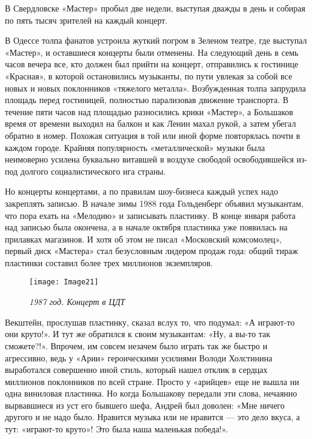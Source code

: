 \documentclass[16pt,a5paper,oneside]{book}
\begin{document}
В Свердловске «Мастер» пробыл две недели, выступая дважды в день и собирая по пять тысяч зрителей на каждый концерт.

В Одессе толпа фанатов устроила жуткий погром в Зеленом театре, где выступал «Мастер», и оставшиеся концерты были
отменены. На следующий день в семь часов вечера все, кто должен был прийти на концерт, отправились к гостинице
«Красная», в которой остановились музыканты, по пути увлекая за собой все новых и новых поклонников «тяжелого металла».
Возбужденная толпа запрудила площадь перед гостиницей, полностью парализовав движение транспорта. В течение пяти часов
над площадью разносились крики «Мастер», а Большаков время от времени выходил на балкон и как Ленин махал рукой, а затем
убегал обратно в номер. Похожая ситуация в той или иной форме повторялась почти в каждом городе. Крайняя популярность
«металлической» музыки была неимоверно усилена буквально витавшей в воздухе свободой освободившейся из-под долгого
социалистического ига страны.

Но концерты концертами, а по правилам шоу-бизнеса каждый успех надо закреплять записью. В начале зимы 1988 года
Гольденберг объявил музыкантам, что пора ехать на «Мелодию» и записывать пластинку. В конце января работа над записью
была окончена, а в начале октября пластинка уже появилась на прилавках магазинов. И хотя об этом не писал «Московский
комсомолец», первый диск «Мастера» стал безусловным лидером продаж года: общий тираж пластинки составил более трех
миллионов экземпляров.

\begin{figure}
    \centering
    \texttt{[image: Image21]}
    \caption{\textit{1987 год. Концерт в ЦДТ}}
\end{figure}

Векштейн, прослушав пластинку, сказал вслух то, что подумал: «А играют-то они круто!». И тут же обратился к своим
музыкантам: «Ну, а вы-то так сможете?!». Впрочем, им совсем незачем было играть так же быстро и агрессивно, ведь у
«Арии» героическими усилиями Володи Холстинина выработался совершенно иной стиль, который нашел отклик в сердцах
миллионов поклонников по всей стране. Просто у «арийцев» еще не вышла ни одна виниловая пластинка. Но когда Большакову
передали эти слова, нечаянно вырвавшиеся из уст его бывшего шефа, Андрей был доволен: «Мне ничего другого и не надо
было. Нравится музыка или не нравится — это дело вкуса, а тут: «играют-то круто»! Это была наша маленькая победа!».
\end{document}
